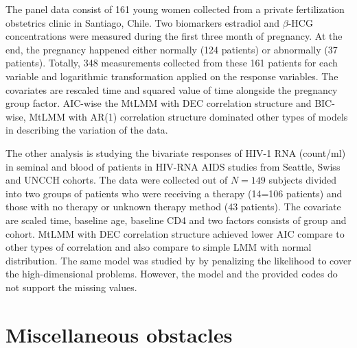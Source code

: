 \documentclass[]{article}
\begin{document}
		The panel data consist of 161 young women collected from a private fertilization obstetrics clinic in Santiago, Chile. Two biomarkers estradiol and $\beta$-HCG concentrations were measured during the first three month of pregnancy. At the end, the pregnancy happened either normally (124 patients) or abnormally (37 patients). Totally, 348 measurements collected from these 161 patients for each variable and logarithmic transformation applied on the response variables. The covariates are rescaled time and squared value of time alongside the pregnancy group factor. AIC-wise the MtLMM with DEC correlation structure and BIC-wise, MtLMM with AR(1) correlation structure dominated other types of models in describing the variation of the data. 
		
		The other analysis is studying the bivariate responses of HIV-1 RNA (count/ml) in seminal and blood of patients in HIV-RNA AIDS studies from Seattle, Swiss and UNCCH cohorts. The data were collected out of $N=149$ subjects divided into two groups of patients who were receiving a therapy (14=106 patients) and those with no therapy or unknown therapy method (43 patients). The covariate are scaled time, baseline age, baseline CD4 and two factors consists of group and cohort.  MtLMM with DEC correlation structure achieved lower AIC compare to other types of correlation and also compare to simple LMM with normal distribution. The same model was studied by \cite{TaavoniArashi2022} by penalizing the likelihood to cover the high-dimensional problems. However, the model and the provided codes do not support the missing values. 
		
		
		
		
		
		\section{Miscellaneous obstacles}
		
\end{document}
